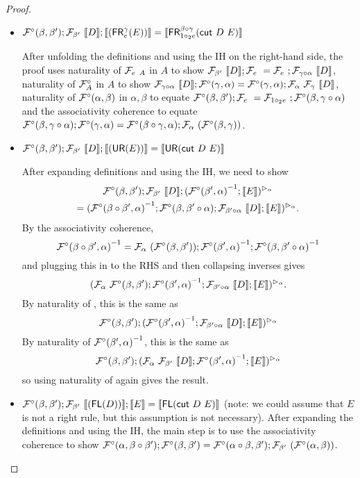 \documentclass{drl-common/llncs}
\renewcommand{\sem}[1]{\ensuremath{ \llbracket #1 \rrbracket}}
\newcommand{\inv}[1]{\ensuremath{{#1}^{-1}}}
\newcommand\compo[2]{\ensuremath{#1 \circ #2}}
\newcommand\comph[2]{\ensuremath{#1 \mathbin{\circ_2} #2}}
\newcommand\cutsym{\ensuremath{\dsd{cut}}}
\newcommand\cut[2]{\ensuremath{{\cutsym \,\, #1 \,\, #2}}}
\newcommand\FR[3]{\ensuremath{\dsd{FR}^{#1}_{#2}(#3)}}
\newcommand\FL[1]{\ensuremath{\dsd{FL}(#1)}}
\newcommand\UR[1]{\ensuremath{\dsd{UR}(#1)}}
\begin{document}
\begin{proof}
\begin{itemize}
\item $\semofcut D {(\FR \gamma e E)} = \sem{\FR {\compo{\beta}{\gamma}} {\comph{1}{e}} {\cut D E}}$

After unfolding the definitions and using the
IH on the right-hand side, 
the proof uses naturality of $\mathcal{F}_{e} \,\, _A$ in $A$ to show
$\semF{\beta'}{\sem D}; \semF{e} =
\semF{e};\semF{\compo{\gamma}{\alpha}}{\sem D}$, 
naturality of $\mathcal{F}^\circ_A$ in $A$ to show
$\semF{\compo{\gamma}{\alpha}}{\sem D};\semFcomp(\gamma,\alpha) = 
\semFcomp(\gamma,\alpha);\semF{\alpha}{\semF{\gamma}{\sem D}}$,
naturality of $\mathcal{F}^\circ(\alpha,\beta)$ in $\alpha,\beta$ to equate
$\semFcomp(\beta,\beta');\semF{e} =
\semF{\comph{1}{e}};\semFcomp(\beta,\compo{\gamma}{\alpha})$
and the associativity coherence to equate 
$\semFcomp(\beta,\compo{\gamma}{\alpha});\semFcomp(\gamma,\alpha)
= \semFcomp(\compo{\beta}{\gamma},\alpha);\semF{\alpha}(\semFcomp(\beta,\gamma))$.

\item $\semofcut D {(\UR E)} = \sem{\UR {\cut D E}}$

After expanding definitions and using the IH, we need to show
\begin{multline*}
\semFcomp(\beta,\beta');\semF{\beta'}{\sem{D}};\semltor{(\inv{\semFcomp(\beta',\alpha)};\sem{E})}{\alpha}
\\=
\semltor{(\inv{\semFcomp(\compo{\beta}{\beta'},\alpha)};\semFcomp(\beta,\compo{\beta'}{\alpha});\semF{\compo{\beta'}{\alpha}}{\sem D};\sem{E})}{\alpha}.
\end{multline*}
By the associativity coherence, 
\[
\inv{\semFcomp(\compo{\beta}{\beta'},\alpha)} = 
\semF{\alpha}{(\semFcomp(\beta,\beta'))};\inv{\semFcomp(\beta',\alpha)};\inv{\semFcomp(\beta,\compo{\beta'}{\alpha})}
\]
and plugging this in to the RHS and then collapsing inverses gives 
\[
\semltor{(\semF{\alpha}{\semFcomp(\beta,\beta')};\inv{\semFcomp(\beta',\alpha)};\semF{\compo{\beta'}{\alpha}}{\sem D};\sem{E})}{\alpha}.
\]
By naturality of \semltor{}{\alpha}, this is the same as
\[
{\semFcomp(\beta,\beta')};\semltor{(\inv{\semFcomp(\beta',\alpha)};\semF{\compo{\beta'}{\alpha}}{\sem D};\sem{E})}{\alpha}
\]
By naturality of \inv{\semFcomp(\beta',\alpha)}, this is the same as 
\[
{\semFcomp(\beta,\beta')};\semltor{(\semF{\alpha}{\semF{\beta'}{\sem D}};\inv{\semFcomp(\beta',\alpha)};\sem{E})}{\alpha}
\]
so using naturality of \semltor{}{\alpha} again gives the result.  

\item $\semofcut {(\FL D)} E = \sem{\FL {\cut D E}}$ (note: we could
  assume that $E$ is not a right rule, but this assumption is not
  necessary).  After expanding the definitions and using the IH, the
  main step is to use the associativity coherence to show
  $\semFcomp(\alpha,\compo{\beta}{\beta'});\semFcomp(\beta,\beta') =
  \semFcomp(\compo{\alpha}{\beta},\beta');\semF{\beta'}(\semFcomp(\alpha,\beta))$.


\end{itemize}
\end{proof}
\end{document}
